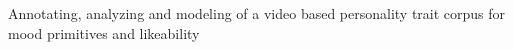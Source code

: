 Annotating, analyzing and modeling of a video based personality trait corpus for mood primitives and likeability